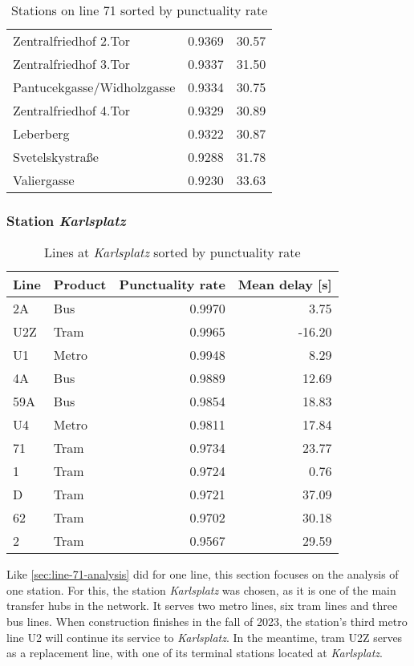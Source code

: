 \begin{table}
\begin{tabular}{lrr}
		Zentralfriedhof 2.Tor        &    0.9369 &  30.57 \\
		Zentralfriedhof 3.Tor        &    0.9337 &  31.50 \\
		Pantucekgasse/Widholzgasse   &    0.9334 &  30.75 \\
		Zentralfriedhof 4.Tor        &    0.9329 &  30.89 \\
		Leberberg                    &    0.9322 &  30.87 \\
		Svetelskystraße              &    0.9288 &  31.78 \\
		Valiergasse                  &    0.9230 &  33.63 \\
		\bottomrule
	\end{tabular}
	\caption{Stations on line 71 sorted by punctuality rate}
	\label{table:tram-71-stations}
\end{table}

\subsubsection{Station \textit{Karlsplatz}}

\begin{table}
	\centering
	\begin{tabular}{llrr}
		\toprule
		Line & Product & Punctuality rate & Mean delay [s] \\
		\midrule
		2A & Bus & 0.9970 & 3.75 \\
		U2Z & Tram & 0.9965 & -16.20 \\
		U1 & Metro & 0.9948 & 8.29 \\
		4A & Bus & 0.9889 & 12.69 \\
		59A & Bus & 0.9854 & 18.83 \\
		U4 & Metro & 0.9811 & 17.84 \\
		71 & Tram & 0.9734 & 23.77 \\
		1 & Tram & 0.9724 & 0.76 \\
		D & Tram & 0.9721 & 37.09 \\
		62 & Tram & 0.9702 & 30.18 \\
		2 & Tram & 0.9567 & 29.59 \\
		\bottomrule
	\end{tabular}
	\caption{Lines at \textit{Karlsplatz} sorted by punctuality rate}
	\label{table:karlsplatz-lines}
\end{table}

Like \cref{sec:line-71-analysis} did for one line, this section focuses on the analysis of one station. For this, the station \textit{Karlsplatz} was chosen, as it is one of the main transfer hubs in the network. It serves two metro lines, six tram lines and three bus lines. When construction finishes in the fall of 2023, the station's third metro line U2 will continue its service to \textit{Karlsplatz}. In the meantime, tram U2Z serves as a replacement line, with one of its terminal stations located at \textit{Karlsplatz}.

